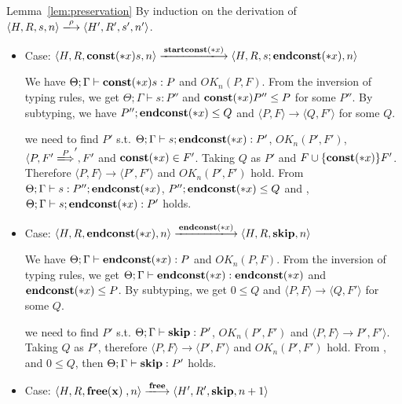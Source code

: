\begin{pfof}{Lemma~\ref{lem:preservation}}
By induction on the derivation of \(\langle H,R,s,n \rangle
\xlongrightarrow{\rho} \langle H',R',s', n' \rangle\).

\begin{itemize}

\item Case: \( \langle H, R, \scon\Sirx s, n \rangle
  \xlongrightarrow{\Startconst} \langle H, R, s;\Endconst, n \rangle \)

  We have \( \Theta; \Gamma \vdash \mathbf{const}(*x) s:P\) and \( OK_n(P, F)
  \). From the inversion of typing rules, we get \( \Theta; \Gamma
  \vdash s:P'' \) and \( \mathbf{const}(*x) P'' \le P \) for some \( P''
  \). By subtyping, we have \( P'';\mathbf{endconst}(*x) \le Q \) and \( \langle
  P, F \rangle \rightarrow \langle Q, F' \rangle \) for some \( Q \).

  we need to find \(P'\) s.t. \( \Theta; \Gamma \vdash
  s;\mathbf{endconst}(*x):P'\), \( OK_n(P', F')\), \( \langle P, F'
  \xLongrightarrow P', F' \) and \(\mathbf{const}(*x)\in F'\). Taking \( Q \)
  as \( P'\) and \( F \cup \{\mathbf{const}(*x)\} F' \). Therefore \( \langle
  P, F \rangle \rightarrow \langle P', F' \rangle\) and \( OK_n(P',
  F')\) hold. From \( \Theta; \Gamma \vdash s:P'';\mathbf{endconst}(*x) \), \(
  P'';\mathbf{endconst}(*x) \le Q \) and , \( \Theta; \Gamma \vdash
  s;\mathbf{endconst}(*x):P'\) holds.

\item Case: \( \langle H, R, \Endconst, n \rangle
  \xlongrightarrow{\Endconst} \langle H, R, \SKIP, n \rangle \)

  We have \( \Theta; \Gamma \vdash \mathbf{endconst}(*x):P\) and \( OK_n(P, F)
  \). From the inversion of typing rules, we get \( \Theta; \Gamma
  \vdash \mathbf{endconst}(*x):\mathbf{endconst}(*x) \) and \( \mathbf{endconst}(*x) \le P \). By
  subtyping, we get \( 0 \le Q \) and \( \langle P, F \rangle
  \rightarrow \langle Q, F' \rangle\) for some \( Q \).

  we need to find \(P'\) s.t. \( \Theta; \Gamma \vdash
  \mathbf{skip}:P'\), \( OK_n(P', F')\) and \( \langle P, F \rangle \rightarrow
  P', F' \rangle \). Taking \( Q \) as \( P'\), therefore \( \langle
  P, F \rangle \rightarrow \langle P', F' \rangle\) and \( OK_n(P', F')\)
  hold. From ,  and \( 0 \le Q\), then \( \Theta;
  \Gamma \vdash \mathbf{skip}:P'\) holds.

\item Case: \(\langle H, R, \FREE, n\rangle \xlongrightarrow{\Free}
  \langle H', R', \SKIP, n + 1 \rangle \)


\end{itemize}
\end{pfof}
